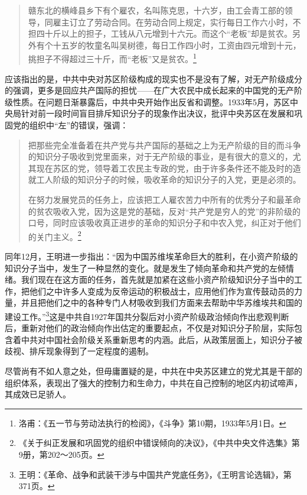 \begin{quote}

赣东北的横峰县乡下有个雇农，名叫陈克思，十六岁，由工会青工部的领导，同雇主订立了劳动合同。在劳动合同上规定，实行每日工作六小时，不担四十斤以上的担子，工钱从八元增到十六元。而这个“老板”却是贫农。另外有个十五岁的牧童名叫吴树德，每日工作四小时，工资由四元增到十元，挑担子不得超过三十斤，而“老板”又是贫农。\footnote{洛甫：《五一节与劳动法执行的检阅》，《斗争》第10期，1933年5月1日。}
\end{quote}


应该指出的是，中共中央对苏区阶级构成的现实也不是没有了解，对无产阶级成分的强调，更多是回应共产国际的担忧——在广大农民中成长起来的中国党的无产阶级性质。在问题日渐暴露后，中共中央开始作出反省和调整。1933年5月，苏区中央局针对前一段时间盲目排斥知识分子的现象作出决议，批评中央苏区在发展和巩固党的组织中“左”的错误，强调：

\begin{quote}

把那些完全准备着在共产党与共产国际的基础之上为无产阶级的目的而斗争的知识分子吸收到党里面来，对于无产阶级的事业，是有很大的意义的，尤其现在苏区的党，领导着工农民主专政的党，由于许多条件还不能及时的造就工人阶级的知识分子的时候，吸收革命的知识分子的入党，更是必须的。

在努力发展党员的任务上，应该把工人雇农苦力中所有的优秀分子和最革命的贫农吸收入党，因为这是党的基础，反对“共产党是穷人的党”的非阶级的口号，同时应该吸收真正进步的革命的知识分子和中农入党，纠正对于他们的关门主义。\footnote{《关于纠正发展和巩固党的组织中错误倾向的决议》，《中共中央文件选集》第9册，第202～205页。}
\end{quote}


同年12月，王明进一步指出：“因为中国苏维埃革命巨大的胜利，在小资产阶级的知识分子当中，发生了一种显然的变化。就是发生了倾向革命和共产党的左倾情绪。我们现在在这方面的任务，首先就是加紧在这些小资产阶级知识分子当中的工作，把他们之中许多人变成为反帝运动的积极战士，应用他们作为宣传鼓动员的力量，并且把他们之中的各种专门人材吸收到我们方面来去帮助中华苏维埃共和国的建设工作。”\footnote{王明：《革命、战争和武装干涉与中国共产党底任务》，《王明言论选辑》，第371页。}这是中共自1927年国共分裂后对小资产阶级政治倾向作出悲观判断后，重新对他们的政治倾向作出估定的重要起点，不仅是对知识分子阶层，实际包含着中共对中国社会阶级关系重新思考的内涵。此后，从政策层面上，知识分子被歧视、排斥现象得到了一定程度的遏制。


尽管尚有不如人意之处，但毋庸置疑的是，中共在中央苏区建立的党尤其是干部的组织体系，表现出了强大的控制力和生命力，中共在自己控制的地区内初试啼声，其成效已足骄人。

